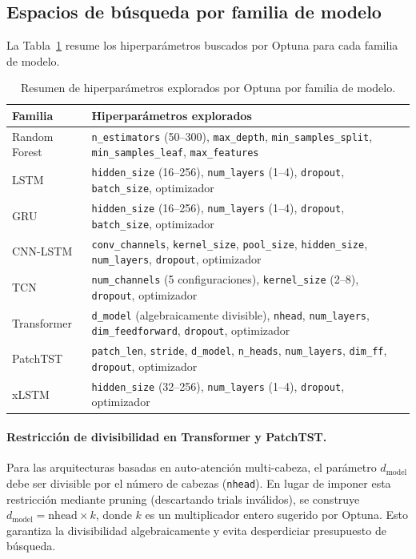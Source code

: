 \documentclass[12pt, a4paper]{article}
\newcommand{\code}[1]{\texttt{#1}}
\begin{document}
\subsection{Espacios de búsqueda por familia de modelo}

La Tabla~\ref{tab:search_spaces} resume los hiperparámetros buscados por Optuna para cada familia de modelo.

\begin{table}[H]
\centering
\caption{Resumen de hiperparámetros explorados por Optuna por familia de modelo.}
\label{tab:search_spaces}
\small
\begin{tabular}{@{}lp{9cm}@{}}
\toprule
\textbf{Familia} & \textbf{Hiperparámetros explorados} \\
\midrule
Random Forest & \code{n\_estimators} (50--300), \code{max\_depth}, \code{min\_samples\_split}, \code{min\_samples\_leaf}, \code{max\_features} \\
LSTM & \code{hidden\_size} (16--256), \code{num\_layers} (1--4), \code{dropout}, \code{batch\_size}, optimizador \\
GRU & \code{hidden\_size} (16--256), \code{num\_layers} (1--4), \code{dropout}, \code{batch\_size}, optimizador \\
CNN-LSTM & \code{conv\_channels}, \code{kernel\_size}, \code{pool\_size}, \code{hidden\_size}, \code{num\_layers}, \code{dropout}, optimizador \\
TCN & \code{num\_channels} (5 configuraciones), \code{kernel\_size} (2--8), \code{dropout}, optimizador \\
Transformer & \code{d\_model} (algebraicamente divisible), \code{nhead}, \code{num\_layers}, \code{dim\_feedforward}, \code{dropout}, optimizador \\
PatchTST & \code{patch\_len}, \code{stride}, \code{d\_model}, \code{n\_heads}, \code{num\_layers}, \code{dim\_ff}, \code{dropout}, optimizador \\
xLSTM & \code{hidden\_size} (32--256), \code{num\_layers} (1--4), \code{dropout}, optimizador \\
\bottomrule
\end{tabular}
\end{table}

\paragraph{Restricción de divisibilidad en Transformer y PatchTST.}
Para las arquitecturas basadas en auto-atención multi-cabeza, el parámetro $d_{\text{model}}$ debe ser divisible por el número de cabezas (\code{nhead}). En lugar de imponer esta restricción mediante pruning (descartando trials inválidos), se construye $d_{\text{model}} = \text{nhead} \times k$, donde $k$ es un multiplicador entero sugerido por Optuna. Esto garantiza la divisibilidad algebraicamente y evita desperdiciar presupuesto de búsqueda.
\end{document}
